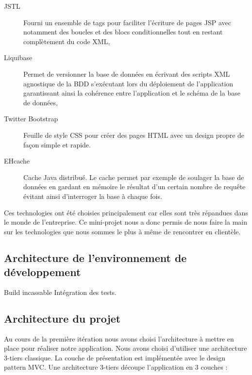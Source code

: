 \begin{description}
	\item[JSTL] Fourni un ensemble de tags pour faciliter l'écriture de pages JSP avec notamment des boucles et des blocs conditionnelles tout en restant complètement du code XML,
	
	\item[Liquibase] Permet de versionner la base de données en écrivant des scripts XML agnostique de la BDD s'exécutant lors du déploiement de l'application garantissant ainsi la cohérence entre l'application et le schéma de la base de données,
	
	\item[Twitter Bootstrap] Feuille de style CSS pour créer des pages HTML avec un design propre de façon simple et rapide.
	
	\item[EHcache] Cache Java distribué. Le cache permet par exemple de soulager la base de données en gardant en mémoire le résultat d'un certain nombre de requête évitant ainsi d'interroger la base à chaque fois.\\
	
	
\end{description}

Ces technologies ont été choisies principalement car elles sont très répandues dans le monde de l'entreprise. Ce mini-projet nous a donc permis de nous faire la main sur les technologies que nous sommes le plus à même de rencontrer en clientèle.

\subsection{Architecture de l'environnement de développement}

Build incassable
Intégration des tests.

\subsection{Architecture du projet}

Au cours de la première itération nous avons choisi l'architecture à mettre en place pour réaliser notre application. Nous avons choisi d'utiliser une architecture 3-tiers classique. La couche de présentation est implémentée avec le design pattern MVC. Une architecture 3-tiers découpe l'application en 3 couches :

